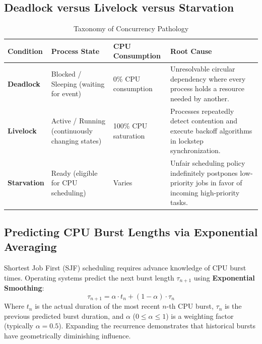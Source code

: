 \subsection{Deadlock versus Livelock versus Starvation}
\begin{table}[htbp]
\centering
\small
\caption{Taxonomy of Concurrency Pathology}
\label{tab:concurrency_pathology}
\begin{tabularx}{\textwidth}{l p{2.8cm} p{3.5cm} X}
\toprule
\textbf{Condition} & \textbf{Process State} & \textbf{CPU Consumption} & \textbf{Root Cause} \\
\midrule
\textbf{Deadlock} & Blocked / Sleeping (waiting for event) & 0\% CPU consumption & Unresolvable circular dependency where every process holds a resource needed by another. \\
\textbf{Livelock} & Active / Running (continuously changing states) & 100\% CPU saturation & Processes repeatedly detect contention and execute backoff algorithms in lockstep synchronization. \\
\textbf{Starvation} & Ready (eligible for CPU scheduling) & Varies & Unfair scheduling policy indefinitely postpones low-priority jobs in favor of incoming high-priority tasks. \\
\bottomrule
\end{tabularx}
\end{table}

\subsection{Predicting CPU Burst Lengths via Exponential Averaging}
Shortest Job First (SJF) scheduling requires advance knowledge of CPU burst times. Operating systems predict the next burst length $\tau_{n+1}$ using \textbf{Exponential Smoothing}:
\begin{equation}
\boxed{\tau_{n+1} = \alpha \cdot t_n + (1 - \alpha) \cdot \tau_n}
\end{equation}
Where $t_n$ is the actual duration of the most recent $n$-th CPU burst, $\tau_n$ is the previous predicted burst duration, and $\alpha$ ($0 \le \alpha \le 1$) is a weighting factor (typically $\alpha = 0.5$). Expanding the recurrence demonstrates that historical bursts have geometrically diminishing influence.

